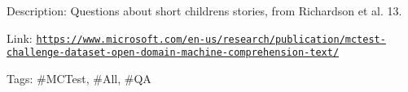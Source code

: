Description\+: Questions about short children\textquotesingle{}s stories, from Richardson et al. \textquotesingle{}13.

Link\+: \href{https://www.microsoft.com/en-us/research/publication/mctest-challenge-dataset-open-domain-machine-comprehension-text/}{\tt https\+://www.\+microsoft.\+com/en-\/us/research/publication/mctest-\/challenge-\/dataset-\/open-\/domain-\/machine-\/comprehension-\/text/}

Tags\+: \#\+M\+C\+Test, \#\+All, \#\+QA 